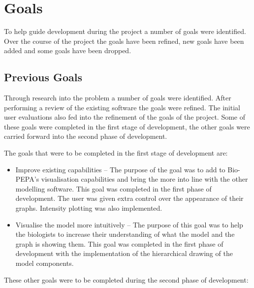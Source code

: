 \chapter{Goals}
\label{chap:goals}

To help guide development during the project a number of goals were identified.  Over the course of the project the goals have been refined, new goals have been added and some goals have been dropped.

\section{Previous Goals}
Through research into the problem a number of goals were identified.  After performing a review of the existing software the goals were refined.  The initial user evaluations also fed into the refinement of the goals of the project.  Some of these goals were completed in the first stage of development, the other goals were carried forward into the second phase of development.

The goals that were to be completed in the first stage of development are:

\begin{itemize}
\item Improve existing capabilities -- The purpose of the goal was to add to Bio-PEPA's visualisation capabilities and bring the more into line with the other modelling software.  This goal was completed in the first phase of development. The user was given extra control over the appearance of their graphs.  Intensity plotting was also implemented.
\item Visualise the model more intuitively -- The purpose of this goal was to help the biologists to increase their understanding of what the model and the graph is showing them.  This goal was completed in the first phase of development with the implementation of the hierarchical drawing of the model components.
\end{itemize}

These other goals were to be completed during the second phase of development:

